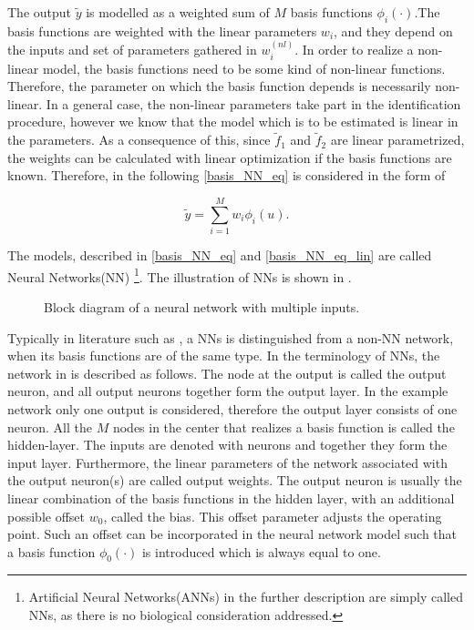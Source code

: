The output $\tilde{y}$ is modelled as a weighted sum of $M$ basis functions $\phi_i(\cdot)$.The basis functions are weighted with the linear parameters $w_i$, and they depend on the inputs and set of parameters gathered in $w^{(nl)}_i$. In order to realize a non-linear model, the basis functions need to be some kind of non-linear functions. Therefore, the parameter on which the basis function depends is necessarily non-linear. In a general case, the non-linear parameters take part in the identification procedure, however we know that the model which is to be estimated is linear in the parameters. As a consequence of this, since $\tilde{f}_1$ and $\tilde{f}_2$ are linear parametrized, the weights can be calculated with linear optimization if the basis functions are known. Therefore, in the following \eqref{basis_NN_eq} is considered in the form of

 \begin{equation}
\label{basis_NN_eq_lin}
\tilde{y} = \sum_{i = 1}^M w_i \phi_i(u).
\end{equation}

The models, described in \eqref{basis_NN_eq} and \eqref{basis_NN_eq_lin} are called Neural Networks(NN) \footnote{Artificial Neural Networks(ANNs) in the further description are simply called NNs, as there is no biological consideration addressed.}. The illustration of NNs is shown in .

\begin{figure}[H]
\centering
 
\caption{Block diagram of a neural network with multiple inputs.}
\label{fig:nn_example_block}
\end{figure}

\vspace{-3mm}

Typically in literature such as \cite{nelles2013nonlinear, norgaard2003neural}, a NNs is distinguished from a non-NN network, when its basis functions are of the same type. In the terminology of NNs, the network in  is described as follows. The node at the output is called the output neuron, and all output neurons together form the output layer. In the example network only one output is considered, therefore the output layer consists of one neuron. All the $M$ nodes in the center that realizes a basis function is called the hidden-layer. The inputs are denoted with neurons and together they form the input layer. Furthermore, the linear parameters of the network associated with the output neuron(s) are called output weights. The output neuron is usually the linear combination of the basis functions in the hidden layer, with an additional possible offset $w_0$, called the bias. This offset parameter adjusts the operating point. Such an offset can be incorporated in the neural network model such that a basis function $\phi_0(\cdot)$ is introduced which is always equal to one. 

